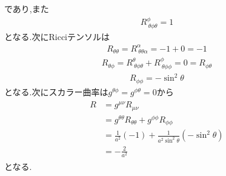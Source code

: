 \documentclass[uplatex,a4j,11pt,dvipdfmx]{jsarticle}
\begin{document}
であり,また
\begin{align}
  R^\phi_{\ \theta\phi\theta}=1
\end{align}
となる.次にRicciテンソルは
\begin{align}
  R_{\theta\theta}=R^\alpha_{\ \theta\theta\alpha}=-1+0=-1
\end{align}
\begin{align}
  R_{\theta\phi}=R^\theta_{\ \theta\phi\theta}+R^\phi_{\ \theta\phi\phi}=0=R_{\phi\theta}
\end{align}
\begin{align}
  R_{\phi\phi}=-\sin^2\theta
\end{align}
となる.次にスカラー曲率は$g^{\theta\phi}=g^{\phi\theta}=0$から
\begin{align}
  \begin{split}
    R&=g^{\mu\nu}R_{\mu\nu}\\
    &=g^{\theta\theta}R_{\theta\theta}+g^{\phi\phi}R_{\phi\phi}\\
    &=\frac{1}{a^2}(-1)+\frac{1}{a^2\sin^2\theta}(-\sin^2\theta)\\
    &=-\frac{2}{a^2}
  \end{split}
\end{align}
となる.
\end{document}

